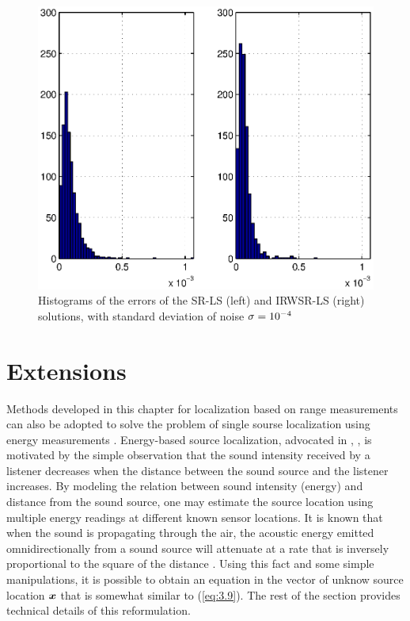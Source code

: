 
\begin{figure}[ht]
\centering
\includegraphics[width=1\textwidth,height=0.42\textheight]{figures/range_dif_IRWLS/Noise04LeftBeckRightRD}%
\caption{Histograms of the errors of the SR-LS (left) and IRWSR-LS (right) solutions, with standard deviation of noise  $\protect\sigma = 10^{-4}$}
\label{fig:Noise04IRDW}
\end{figure}


\section{Extensions}


Methods developed in this chapter for localization based on range measurements can also be adopted to solve the problem of single sourse localization using energy measurements \cite{StLi}. 
Energy-based source localization, advocated in \cite{LiHu}, \cite{Saric}, is motivated by the simple observation that the sound intensity received by a listener decreases when the distance between the sound source and the listener increases. By modeling the relation between sound intensity (energy) and distance from the sound source, one may estimate the source location using multiple energy readings at different known sensor locations. It is known that when the sound is propagating through the air, the acoustic energy emitted omnidirectionally from a sound source will attenuate at a rate that is inversely proportional to the square of the distance \cite{LiHu}. Using this fact and some simple manipulations, it is possible to obtain an equation in the vector of unknow source location $\mbox{\boldmath$x$}$ that is somewhat similar to (\ref{eq:3.9}). The rest of the section provides technical details of this reformulation. 


